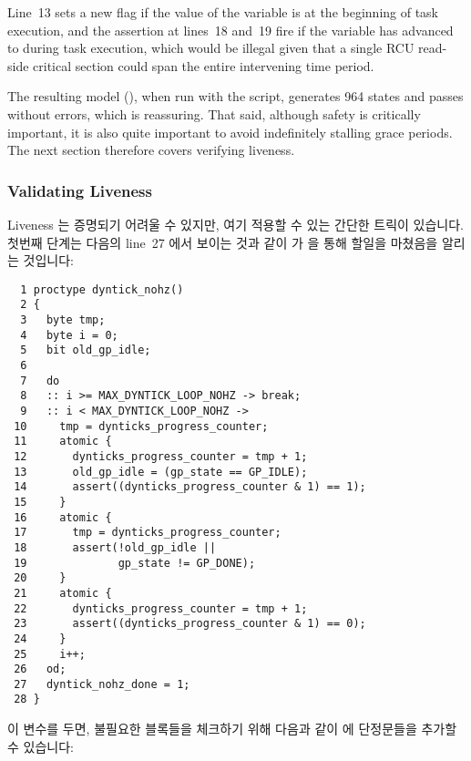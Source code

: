 Line~13 sets a new  flag if the
value of the  variable is
 at the beginning of task execution,
and the assertion at lines~18 and~19 fire if the 
variable has advanced to  during task execution,
which would be illegal given that a single RCU read-side critical
section could span the entire intervening time period.

The resulting
model (),
when run with the  script,
generates 964 states and passes without errors, which is reassuring.
That said, although safety is critically important, it is also quite
important to avoid indefinitely stalling grace periods.
The next section therefore covers verifying liveness.
\fi

\subsubsection{Validating Liveness}
\label{sec:formal:Validating Liveness}

Liveness 는 증명되기 어려울 수 있지만, 여기 적용할 수 있는 간단한 트릭이
있습니다.
첫번째 단계는 다음의 line~27 에서 보이는 것과 같이  가
 을 통해 할일을 마쳤음을 알리는 것입니다:
\iffalse

Although liveness can be difficult to prove, there is a simple
trick that applies here.
The first step is to make \co{dyntick_nohz()} indicate that
it is done via a \co{dyntick_nohz_done} variable, as shown on
line~27 of the following:
\fi

{ \scriptsize
\begin{verbatim}
  1 proctype dyntick_nohz()
  2 {
  3   byte tmp;
  4   byte i = 0;
  5   bit old_gp_idle;
  6
  7   do
  8   :: i >= MAX_DYNTICK_LOOP_NOHZ -> break;
  9   :: i < MAX_DYNTICK_LOOP_NOHZ ->
 10     tmp = dynticks_progress_counter;
 11     atomic {
 12       dynticks_progress_counter = tmp + 1;
 13       old_gp_idle = (gp_state == GP_IDLE);
 14       assert((dynticks_progress_counter & 1) == 1);
 15     }
 16     atomic {
 17       tmp = dynticks_progress_counter;
 18       assert(!old_gp_idle ||
 19              gp_state != GP_DONE);
 20     }
 21     atomic {
 22       dynticks_progress_counter = tmp + 1;
 23       assert((dynticks_progress_counter & 1) == 0);
 24     }
 25     i++;
 26   od;
 27   dyntick_nohz_done = 1;
 28 }
\end{verbatim}
}

이 변수를 두면, 불필요한 블록들을 체크하기 위해 다음과 같이 
에 단정문들을 추가할 수 있습니다:
\iffalse


